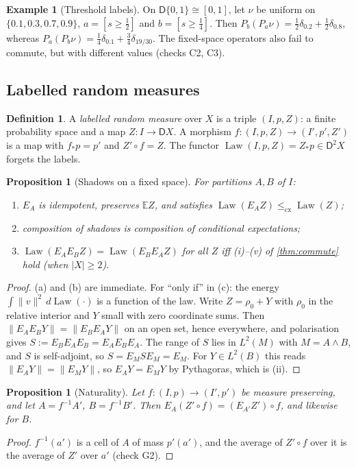 \documentclass[11pt]{article}
\newtheorem{proposition}[theorem]{Proposition}
\theoremstyle{definition}
\newtheorem{definition}[theorem]{Definition}
\newtheorem{example}[theorem]{Example}
\newcommand{\D}{\mathsf D}
\newcommand{\cx}{\le_{\mathrm{cx}}}
\newcommand{\Law}{\operatorname{Law}}
\newcommand{\EE}{\mathbb E}
\begin{document}
\begin{example}[Threshold labels]\label{ex:threshold}
On $\D\{0,1\}\cong[0,1]$, let $\nu$ be uniform on $\{0.1,0.3,0.7,0.9\}$, $a=[s\ge\tfrac12]$ and $b=[s\ge\tfrac14]$. Then
$P_b(P_a\nu)=\tfrac12\delta_{0.2}+\tfrac12\delta_{0.8}$, whereas $P_a(P_b\nu)=\tfrac14\delta_{0.1}+\tfrac34\delta_{19/30}$. The
fixed-space operators also fail to commute, but with different values (checks C2, C3).
\end{example}

\subsection{Labelled random measures}
\begin{definition}\label{def:lrm}
A \emph{labelled random measure} over $X$ is a triple $(I,p,Z)$: a finite probability space and a map $Z\colon I\to\D X$. A
morphism $f\colon(I,p,Z)\to(I',p',Z')$ is a map with $f_*p=p'$ and $Z'\circ f=Z$. The functor $\Law(I,p,Z)=Z_*p\in\D^2X$ forgets the
labels.
\end{definition}

\begin{proposition}[Shadows on a fixed space]\label{prop:law-functor}
For partitions $A,B$ of $I$:
\begin{enumerate}[label=(\alph*)]
\item $E_A$ is idempotent, preserves $\EE Z$, and satisfies $\Law(E_AZ)\cx\Law(Z)$;
\item composition of shadows is composition of conditional expectations;
\item $\Law(E_AE_BZ)=\Law(E_BE_AZ)$ for all $Z$ iff (i)--(v) of \cref{thm:commute} hold (when $|X|\ge2$).
\end{enumerate}
\end{proposition}
\begin{proof}
(a) and (b) are immediate. For ``only if'' in (c): the energy $\int\lVert v\rVert^2\,d\Law(\cdot)$ is a function of the law. Write
$Z=\rho_0+Y$ with $\rho_0$ in the relative interior and $Y$ small with zero coordinate sums. Then
$\lVert E_AE_BY\rVert=\lVert E_BE_AY\rVert$ on an open set, hence everywhere, and polarisation gives $S:=E_BE_AE_B=E_AE_BE_A$. The
range of $S$ lies in $L^2(M)$ with $M=A\wedge B$, and $S$ is self-adjoint, so $S=E_MSE_M=E_M$. For $Y\in L^2(B)$ this reads
$\lVert E_AY\rVert=\lVert E_MY\rVert$, so $E_AY=E_MY$ by Pythagoras, which is (ii).
\end{proof}

\begin{proposition}[Naturality]\label{prop:naturality}
Let $f\colon(I,p)\to(I',p')$ be measure preserving, and let $A=f^{-1}A'$, $B=f^{-1}B'$. Then $E_A(Z'\circ f)=(E_{A'}Z')\circ f$, and
likewise for $B$.
\end{proposition}
\begin{proof}
$f^{-1}(a')$ is a cell of $A$ of mass $p'(a')$, and the average of $Z'\circ f$ over it is the average of $Z'$ over $a'$ (check G2).
\end{proof}
\end{document}
